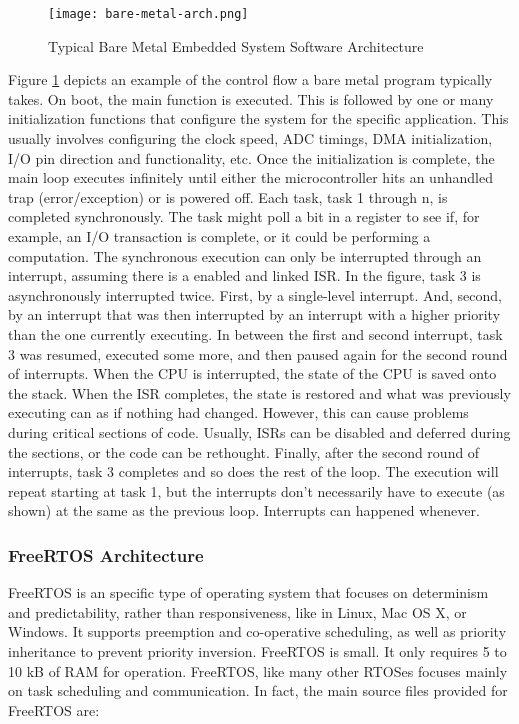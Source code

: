 \begin{figure}
\centering
\texttt{[image: bare-metal-arch.png]}
\caption{Typical Bare Metal Embedded System Software Architecture}
\label{fig:bare-metal-arch}
\end{figure}

Figure \ref{fig:bare-metal-arch} depicts an example of the control flow a bare
metal program typically takes. On boot, the main function is executed. This is
followed by one or many initialization functions that configure the system for
the specific application. This usually involves configuring the clock speed, ADC
timings, DMA initialization, I/O pin direction and functionality, etc. Once the
initialization is complete, the main loop executes infinitely until either the
microcontroller hits an unhandled trap (error/exception) or is powered off. Each
task, task 1 through n, is completed synchronously. The task might poll a bit in
a register to see if, for example, an I/O transaction is complete, or it could
be performing a computation. The synchronous execution can only be interrupted
through an interrupt, assuming there is a enabled and linked ISR. In the figure,
task 3 is asynchronously interrupted twice. First, by a single-level interrupt.
And, second, by an interrupt that was then interrupted by an interrupt with a
higher priority than the one currently executing. In between the first and
second interrupt, task 3 was resumed, executed some more, and then paused again
for the second round of interrupts. When the CPU is interrupted, the state of
the CPU is saved onto the stack. When the ISR completes, the state is restored
and what was previously executing can as if nothing had changed.  However, this
can cause problems during critical sections of code. Usually, ISRs can be
disabled and deferred during the sections, or the code can be rethought.
Finally, after the second round of interrupts, task 3 completes and so does the
rest of the loop. The execution will repeat starting at task 1, but the
interrupts don't necessarily have to execute (as shown) at the same as the
previous loop. Interrupts can happened whenever.


\subsubsection{FreeRTOS Architecture}
FreeRTOS is an specific type of operating system that focuses on determinism and
predictability, rather than responsiveness, like in Linux, Mac OS X, or Windows.
It supports preemption and co-operative scheduling, as well as priority
inheritance to prevent priority inversion. FreeRTOS is small. It only requires 5
to 10 kB of RAM for operation. FreeRTOS, like many other RTOSes focuses mainly
on task scheduling and communication. In fact, the main source files provided
for FreeRTOS are:

